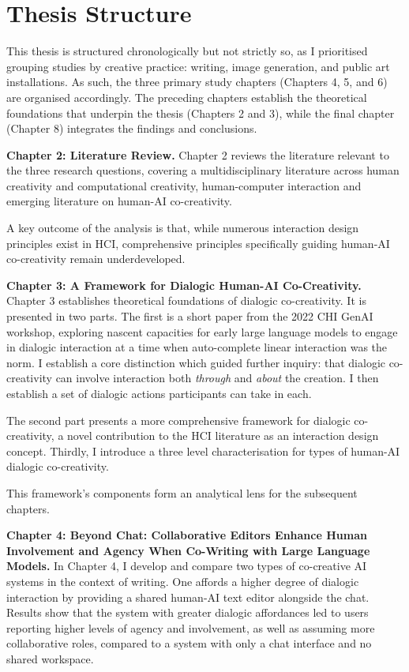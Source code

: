 \section{Thesis Structure}

This thesis is structured chronologically but not strictly so, as I prioritised grouping studies by creative practice: writing, image generation, and public art installations. As such, the three primary study chapters (Chapters 4, 5, and 6) are organised accordingly. The preceding chapters establish the theoretical foundations that underpin the thesis (Chapters 2 and 3), while the final chapter (Chapter 8) integrates the findings and conclusions.

\textbf{Chapter 2: Literature Review.} Chapter 2 reviews the literature relevant to the three research questions, covering a multidisciplinary literature across human creativity and computational creativity, human-computer interaction and emerging literature on human-AI co-creativity. 

 A key outcome of the analysis is that, while numerous interaction design principles exist in HCI, comprehensive principles specifically guiding human-AI co-creativity remain underdeveloped.

\textbf{Chapter 3: A Framework for Dialogic Human-AI Co-Creativity.} Chapter 3 establishes theoretical foundations of dialogic co-creativity. It is presented in two parts. The first is a short paper from the 2022 CHI GenAI workshop, exploring nascent capacities for early large language models to engage in dialogic interaction at a time when auto-complete linear interaction was the norm. I establish a core distinction which guided further inquiry: that dialogic co-creativity can involve interaction both \textit{through} and \textit{about} the creation. I then establish a set of dialogic actions participants can take in each. 

The second part presents a more comprehensive framework for dialogic co-creativity, a novel contribution to the HCI literature as an interaction design concept. Thirdly, I introduce a three level characterisation for types of human-AI dialogic co-creativity.

This framework's components form an analytical lens for the subsequent chapters.

\textbf{Chapter 4: Beyond Chat: Collaborative Editors Enhance Human Involvement and Agency When Co-Writing with Large Language Models.} In Chapter 4, I develop and compare two types of co-creative AI systems in the context of writing. One affords a higher degree of dialogic interaction by providing a shared human-AI text editor alongside the chat. Results show that the system with greater dialogic affordances led to users reporting higher levels of agency and involvement, as well as assuming more collaborative roles, compared to a system with only a chat interface and no shared workspace.


